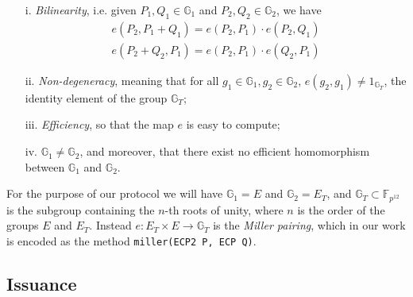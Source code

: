 \begin{itemize}

\item [i.] \emph{Bilinearity}, i.e. given $P_1,Q_1\in\mathbb{G}_1$
  and $P_2,Q_2\in\mathbb{G}_2$, we have
  \begin{align*}
    e(P_2,P_1+Q_1) = e(P_2,P_1)\cdot e(P_2,Q_1)   \\
    e(P_2+Q_2,P_1) = e(P_2,P_1)\cdot e(Q_2,P_1)
  \end{align*}

\item[ii.] \emph{Non-degeneracy}, meaning that for all
  $g_1\in\mathbb{G}_1, g_2\in\mathbb{G}_2$, $e(g_2,g_1)\ne
  1_{\mathbb{G}_T}$, the identity element of the group
  $\mathbb{G}_T$;

\item[iii.] \emph{ Efficiency}, so that the map $e$ is easy to
  compute;

\item[iv. ] $\mathbb{G}_1\ne \mathbb{G}_2$, and moreover, that
  there exist no efficient homomorphism between $\mathbb{G}_1$ and
  $\mathbb{G}_2$.

\end{itemize}

For the purpose of our protocol we will have $\mathbb{G}_1 = E$ and
$\mathbb{G}_2 = E_T$, and $\mathbb{G}_T\subset \mathbb{F}_{p^{12}}$ is
the subgroup containing the $n$-th roots of unity, where $n$ is the
order of the groups $E$ and $E_T$. Instead $e: E_T \times E\to
\mathbb{G}_T$ is the \emph{Miller pairing}, which in our work is
encoded as the method \verb!miller(ECP2 P, ECP Q)!. \\


\subsection{Issuance} \label{issuance}

